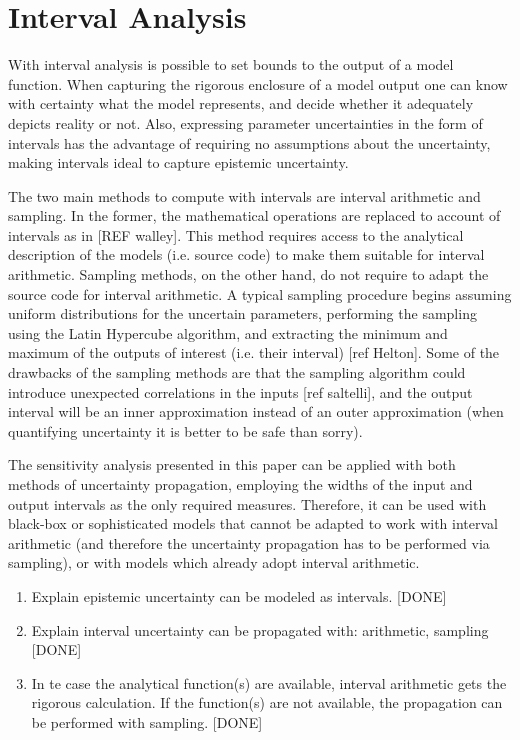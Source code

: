 \documentclass[twocolumn]{rps-esrel2022}
\begin{document}
\section{Interval Analysis}

With interval analysis is possible to set bounds to the output of a model function.
When capturing the rigorous enclosure of a model output one can know with certainty what the model represents, and decide
whether it adequately depicts reality or not.
Also, expressing parameter uncertainties in the form of intervals has the advantage of requiring no assumptions about the uncertainty, making intervals ideal to
capture epistemic uncertainty.

The two main methods to compute with intervals are interval arithmetic and sampling.
In the former, the mathematical operations are replaced to account of intervals as in [REF walley].
This method requires access to the analytical description of the models (i.e. source code) to make them suitable for
interval arithmetic.
Sampling methods, on the other hand, do not require to adapt the source code for interval arithmetic.
A typical sampling procedure begins assuming uniform distributions for the uncertain parameters, performing
the sampling using the Latin Hypercube algorithm, and extracting the minimum and maximum of the outputs of interest (i.e. their
interval) [ref Helton].
Some of the drawbacks of the sampling methods are that the sampling algorithm could introduce unexpected correlations in the inputs [ref saltelli],
and the output interval will be an inner approximation instead of an outer approximation (when quantifying uncertainty it is better to be safe than sorry).

The sensitivity analysis presented in this paper can be applied with both methods of uncertainty propagation, employing the widths of the input and output intervals as
the only required measures.
Therefore, it can be used with black-box or sophisticated models that cannot be adapted to work with interval arithmetic (and therefore the uncertainty propagation
has to be performed via sampling), or with models which already adopt interval arithmetic.

\begin{enumerate}
	\item Explain epistemic uncertainty can be modeled as intervals. [DONE]
	\item Explain interval uncertainty can be propagated with: arithmetic, sampling [DONE]
	\item In te case the analytical function(s) are available, interval arithmetic gets the rigorous calculation.
	If the function(s) are not available, the propagation can be performed with sampling. [DONE]
\end{enumerate}
\end{document}
